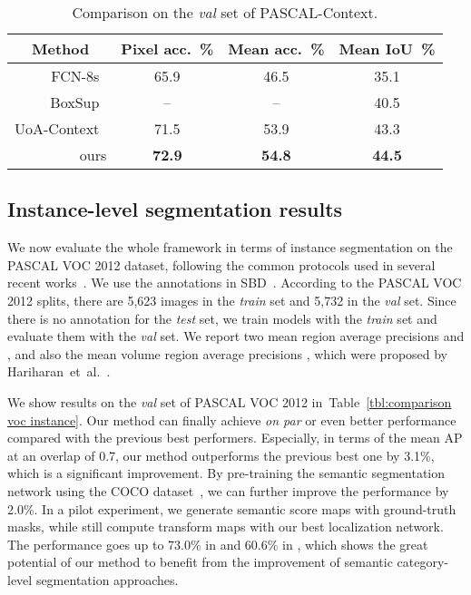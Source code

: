 \documentclass{article}
\begin{document}
\begin{table}[t]
\caption{Comparison on the \emph{val} set of PASCAL-Context.}
\label{tbl:comparison pascal-context}
\centering
\resizebox{0.7\textwidth}{!}
{
\begin{tabular}{r|c|c|c}
\toprule
\multicolumn{1}{c|}{Method} & Pixel acc.~\% & Mean acc.~\% & Mean IoU~\% \\
\hline
FCN-8s~\cite{FCN.CVPR.2015.Long} & 65.9 & 46.5 & 35.1 \\
BoxSup~\cite{BoxSup.ICCV.2015.Dai} & -- & -- & 40.5 \\
UoA-Context~\cite{AdelaideContext.2016.Lin} & 71.5 & 53.9 & 43.3 \\
\hline\
ours & \textbf{72.9} & \textbf{54.8} & \textbf{44.5} \\
\bottomrule
\end{tabular}
}
\end{table}













\subsection{Instance-level segmentation results}
We now evaluate the whole framework in terms of instance segmentation on the PASCAL VOC 2012 dataset, following the common protocols used in several recent works~\cite{SDS.ECCV.2014.Hariharan,HyperColumn.CVPR.2015.Hariharan,MNC.CVPR.2016.Dai}.
We use the annotations in SBD~\cite{SBD.ICCV.2011.Hariharan}.
According to the PASCAL VOC 2012 splits, there are 5,623 images in the \emph{train} set and 5,732 in the \emph{val} set.
Since there is no annotation for the \emph{test} set, we train models with the \emph{train} set and evaluate them with the \emph{val} set.
We report two mean region average precisions  and ,
and also the mean volume region average precisions ,
which were proposed by Hariharan~et~al.~\cite{SDS.ECCV.2014.Hariharan}.



We show results on the \emph{val} set of PASCAL VOC 2012 in~Table~\ref{tbl:comparison voc instance}.
Our method can finally achieve \emph{on par} or even better performance compared with the previous best performers.
Especially, in terms of the mean AP at an overlap of 0.7, our method outperforms the previous best one by 3.1\%, which is a significant improvement.
By pre-training the semantic segmentation network using the COCO dataset~\cite{COCO.ECCV.2014.Lin},
we can further improve the performance by 2.0\%.
In a pilot experiment, we generate semantic score maps with ground-truth masks,
while still compute transform maps with our best localization network.
The performance goes up to 73.0\% in  and 60.6\% in ,
which shows the great potential of our method to benefit from the improvement of semantic category-level segmentation approaches.
\end{document}
